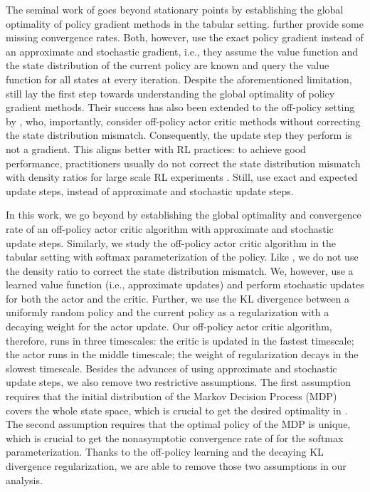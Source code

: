 \documentclass[twoside,11pt]{article}
\numberwithin{assucounter}{section}
\begin{document}
The seminal work of \citet{agarwal2019optimality} goes beyond stationary points 
by establishing the global optimality of policy gradient methods in the tabular setting.
\citet{mei2020global} further provide some missing convergence rates.
Both,
however,
use the exact policy gradient instead of an approximate and stochastic gradient,
i.e.,
they assume the value function and the state distribution of the current policy are known 
and query the value function for all states at every iteration.
Despite the aforementioned limitation,
\citet{agarwal2019optimality} still lay the first step towards understanding the global optimality of policy gradient methods.
Their success has also been extended to the off-policy setting by \citet{laroche2021dr}, who,
importantly, consider off-policy actor critic methods without correcting the state distribution mismatch.
Consequently, 
the update step they perform is not a gradient.
This
aligns better with RL practices:
to achieve good performance, practitioners usually do not correct the state distribution mismatch with density ratios for large scale RL experiments \citep{wang2016sample,espeholt2018impala,vinyals2019grandmaster,schmitt2020off,zahavy2020self}.
Still, \citet{laroche2021dr} use exact and expected update steps,
instead of approximate and stochastic update steps. 

In this work,
we go beyond \citet{agarwal2019optimality,laroche2021dr} by establishing the global optimality and convergence rate of an off-policy actor critic algorithm with approximate and stochastic update steps.
Similarly,
we study the off-policy actor critic algorithm in the tabular setting with softmax parameterization of the policy.
Like \citet{laroche2021dr},
we do not use the density ratio to correct the state distribution mismatch.
We, however,
use a learned value function (i.e., approximate updates) and perform stochastic updates
for both the actor and the critic.
Further, we use the KL divergence between a uniformly random policy and the current policy as a regularization with a decaying weight for the actor update.
Our off-policy actor critic algorithm,
therefore, runs in three timescales:
the critic is updated in the fastest timescale;
the actor runs in the middle timescale;
the weight of regularization decays in the slowest timescale.
Besides the advances of using approximate and stochastic  update steps,%
we also remove two restrictive assumptions.
The first assumption requires that the initial distribution of the Markov Decision Process (MDP) covers the whole state space,
which is crucial to get the desired optimality in \citet{agarwal2019optimality}. 
The second assumption requires that the optimal policy of the MDP is unique,
which is crucial to get the nonasymptotic convergence rate of \citet{laroche2021dr} for the softmax parameterization.
Thanks to the off-policy learning and the decaying KL divergence regularization,
we are able to remove those two assumptions in our analysis.
\end{document}
